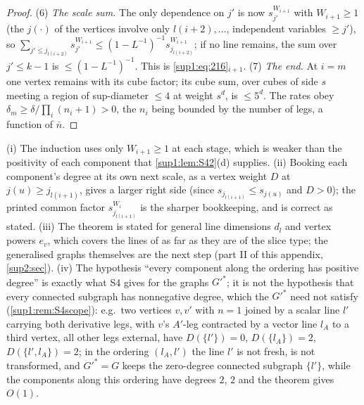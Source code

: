 \begin{proof}
(6) \emph{The scale sum.} The only dependence on $j'$ is now $s_{j'}^{W_{i+1}}$ with $W_{i+1}\ge1$ (the $j(\cdot)$ of the vertices involve only $l(i+2),\dots$, independent variables $\ge j'$), so $\sum_{j'\le j_{l(i+2)}}s_{j'}^{W_{i+1}}\le(1-L^{-1})^{-1}s_{j_{l(i+2)}}^{W_{i+1}}$; if no line remains, the sum over $j'\le k-1$ is $\le(1-L^{-1})^{-1}$. This is \eqref{sup1:eq:216}$_{i+1}$.
(7) \emph{The end.} At $i=m$ one vertex remains with its cube factor; its cube sum, over cubes of side $s$ meeting a region of sup-diameter $\le4$ at weight $s^d$, is $\le5^d$. The rates obey $\delta_m\ge\delta/\prod_i(n_i+1)>0$, the $n_i$ being bounded by the number of legs, a function of $\bar n$.
\end{proof}

\begin{remark}\label{sup1:rem:S5}
(i) The induction uses only $W_{i+1}\ge1$ at each stage, which is weaker than the positivity of each component that \cref{sup1:lem:S42}(d) supplies. (ii) Booking each component's degree at its own next scale, as a vertex weight $D$ at $j(u)\ge j_{l(i+1)}$, gives a larger right side (since $s_{j_{l(i+1)}}\le s_{j(u)}$ and $D>0$); the printed common factor $s_{j_{l(i+1)}}^{W_i}$ is the sharper bookkeeping, and \cite[(2.16)]{Ba3} is correct as stated. (iii) The theorem is stated for general line dimensions $d_l$ and vertex powers $e_v$, which covers the lines of \cite[Prop.~2.2]{Ba3} as far as they are of the slice type; the generalised graphs themselves are the next step (part II of this appendix, \cref{sup2:sec}). (iv) The hypothesis ``every component along the ordering has positive degree'' is exactly what S4 gives for the graphs $G'^*$; it is not the hypothesis that every connected subgraph has nonnegative degree, which the $G'^*$ need not satisfy (\cref{sup1:rem:S4scope}): e.g.\ two \cite[(1.8)]{Ba3} vertices $v,v'$ with $n=1$ joined by a scalar line $l'$ carrying both derivative legs, with $v$'s $A'$-leg contracted by a vector line $l_A$ to a third \cite[(1.8)]{Ba3} vertex, all other legs external, have $D(\{l'\})=0$, $D(\{l_A\})=2$, $D(\{l',l_A\})=2$; in the ordering $(l_A,l')$ the line $l'$ is not fresh, is not transformed, and $G'^*=G$ keeps the zero-degree connected subgraph $\{l'\}$, while the components along this ordering have degrees $2$, $2$ and the theorem gives $O(1)$.
\end{remark}

